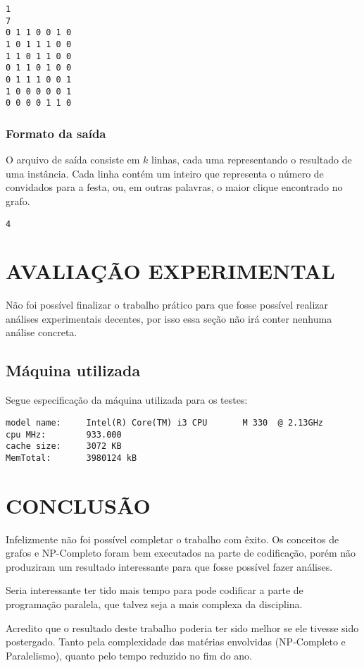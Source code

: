 \documentclass[12pt]{article}
\begin{document}
\begin{verbatim}
1
7
0 1 1 0 0 1 0
1 0 1 1 1 0 0
1 1 0 1 1 0 0
0 1 1 0 1 0 0
0 1 1 1 0 0 1
1 0 0 0 0 0 1
0 0 0 0 1 1 0
\end{verbatim}

\subsubsection{Formato da saída}
\label{saida}

O arquivo de saída consiste em $k$ linhas, cada uma representando o resultado de uma instância. Cada linha contém um inteiro que representa o número de convidados para a festa, ou, em outras palavras, o maior clique encontrado no grafo.

\begin{verbatim}
4
\end{verbatim}


\section{AVALIAÇÃO EXPERIMENTAL}
\label{avaliacao_experimental}

Não foi possível finalizar o trabalho prático para que fosse possível realizar análises experimentais decentes, por isso essa seção não irá conter nenhuma análise concreta.

\subsection{Máquina utilizada}
\label{maquina}

Segue especificação da máquina utilizada para os testes:
\begin{verbatim}
model name:     Intel(R) Core(TM) i3 CPU       M 330  @ 2.13GHz
cpu MHz:        933.000
cache size:     3072 KB
MemTotal:       3980124 kB
\end{verbatim}

\newpage

\section{CONCLUSÃO}
\label{conclusao}

Infelizmente não foi possível completar o trabalho com êxito. Os conceitos de grafos e NP-Completo foram bem executados na parte de codificação, porém não produziram um resultado interessante para que fosse possível fazer análises.

Seria interessante ter tido mais tempo para pode codificar a parte de programação paralela, que talvez seja a mais complexa da disciplina.

Acredito que o resultado deste trabalho poderia ter sido melhor se ele tivesse sido postergado. Tanto pela complexidade das matérias envolvidas (NP-Completo e Paralelismo), quanto pelo tempo reduzido no fim do ano.



\end{document}
